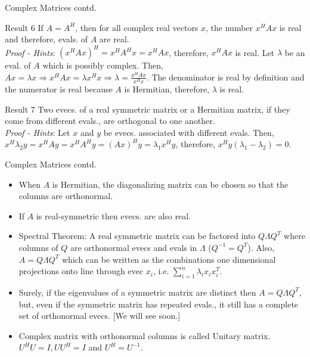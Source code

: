\documentclass{beamer}
\begin{document}
\begin{frame}{Complex Matrices contd.}
\begin{block}{Result 6}
If $A = A^H$, then for all complex real vectors $x$, the number $x^HAx$ is real and therefore, evals. of $A$ are real.\\
\textit{Proof - Hints}: $(x^HAx)^H = x^HA^Hx = x^HAx$, therefore, $x^HAx$ is real. Let $\lambda$ be an eval. of $A$ which is possibly complex. Then, $Ax = \lambda x \Rightarrow x^HAx = \lambda x^Hx \Rightarrow \lambda = \frac{x^HAx}{x^Hx}$. The denominator is real by definition and the numerator is real because $A$ is Hermitian, therefore, $\lambda$ is real.
\end{block}

\begin{block}{Result 7}
Two evecs. of a real symmetric matrix or a Hermitian matrix, if they come from different evals., are orthogonal to one another.\\
\textit{Proof - Hints}: Let $x$ and $y$ be evecs. associated with different evals. Then, $x^H\lambda_2y = x^HAy = x^HA^Hy = (Ax)^Hy = \lambda_1 x^Hy$, therefore, $x^Hy(\lambda_1-\lambda_2) = 0$.
\end{block}
\end{frame}

\begin{frame}{Complex Matrices contd.}
\begin{itemize}
    \item When $A$ is Hermitian, the diagonalizing matrix can be chosen so that the columns are orthonormal.
    \item If $A$ is real-symmetric then evecs. are also real.
    \item Spectral Theorem: A real symmetric matrix can be factored into $Q\Lambda Q^T$ where columns of $Q$ are orthonormal evecs and evals in $\Lambda$ ($Q^{-1}=Q^T$). Also, $A = Q\Lambda Q^T$ which can be written as the combinations one dimensional projections onto line through evec $x_i$, i.e. $\sum_{i=1}^{n}\lambda_i x_ix_i^T$.
    \item Surely, if the eigenvalues of a symmetric matrix are distinct then $A = Q\Lambda Q^T$, but, even if the symmetric matrix has repeated evals., it still has a complete set of orthonormal evecs. [We will see soon.]
    \item Complex matrix with orthonormal columns is called Unitary matrix. $U^HU = I, UU^H = I$ and $U^H = U^{-1}$.
\end{itemize}
\end{frame}
\end{document}
